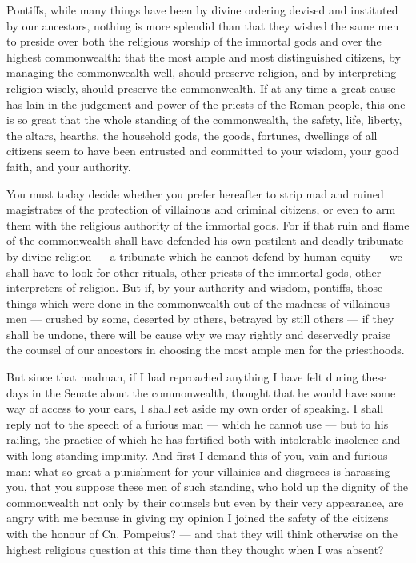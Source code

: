 
 Pontiffs, while many things have been by divine ordering devised and instituted by our ancestors, nothing is more splendid than that they wished the same men to preside over both the religious worship of the immortal gods and over the highest commonwealth: that the most ample and most distinguished citizens, by managing the commonwealth well, should preserve religion, and by interpreting religion wisely, should preserve the commonwealth. If at any time a great cause has lain in the judgement and power of the priests of the Roman people, this one is so great that the whole standing of the commonwealth, the safety, life, liberty, the altars, hearths, the household gods, the goods, fortunes, dwellings of all citizens seem to have been entrusted and committed to your wisdom, your good faith, and your authority.

 You must today decide whether you prefer hereafter to strip mad and ruined magistrates of the protection of villainous and criminal citizens, or even to arm them with the religious authority of the immortal gods. For if that ruin and flame of the commonwealth shall have defended his own pestilent and deadly tribunate by divine religion --- a tribunate which he cannot defend by human equity --- we shall have to look for other rituals, other priests of the immortal gods, other interpreters of religion. But if, by your authority and wisdom, pontiffs, those things which were done in the commonwealth out of the madness of villainous men --- crushed by some, deserted by others, betrayed by still others --- if they shall be undone, there will be cause why we may rightly and deservedly praise the counsel of our ancestors in choosing the most ample men for the priesthoods.

 But since that madman, if I had reproached anything I have felt during these days in the Senate about the commonwealth, thought that he would have some way of access to your ears, I shall set aside my own order of speaking. I shall reply not to the speech of a furious man --- which he cannot use --- but to his railing, the practice of which he has fortified both with intolerable insolence and with long-standing impunity. And first I demand this of you, vain and furious man: what so great a punishment for your villainies and disgraces is harassing you, that you suppose these men of such standing, who hold up the dignity of the commonwealth not only by their counsels but even by their very appearance, are angry with me because in giving my opinion I joined the safety of the citizens with the honour of Cn. Pompeius? --- and that they will think otherwise on the highest religious question at this time than they thought when I was absent?

